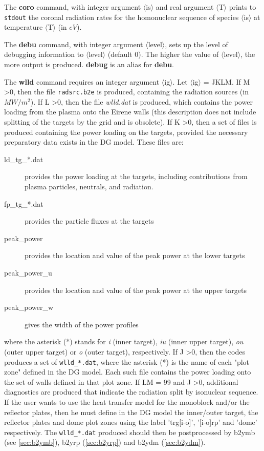 \documentclass[a4paper,10pt]{report}
\begin{document}
The {\bf coro} command, with integer argument $\langle$is$\rangle$ and real argument $\langle$T$\rangle$
prints to {\tt stdout} the coronal radiation
rates for the homonuclear sequence of species $\langle$is$\rangle$ at temperature $\langle$T$\rangle$ (in $eV$).

The {\bf debu} command, with integer argument $\langle$level$\rangle$,
sets up the level of debugging information to $\langle$level$\rangle$ (default 0).
The higher the value of $\langle$level$\rangle$, the more output is produced.
{\bf debug} is an alias for {\bf debu}.

The {\bf wlld} command requires an integer argument $\langle$ig$\rangle$. Let
$\langle$ig$\rangle$ = JKLM. If M \textgreater 0, then the file {\tt radsrc.b2e} is produced,
containing the radiation sources (in $MW/m^2$). If L \textgreater 0, then the
file {\em wlld.dat} is produced, which contains the power loading
from the plasma onto the Eirene walls (this description does not include
splitting of the targets by the grid and is obsolete). If K \textgreater 0, then a
set of files is produced containing the power loading on the targets,
provided the necessary preparatory data exists in the DG model. These files
are:
\begin{description}
  \item[ld\_tg\_*.dat] provides the power loading at the targets, including contributions from plasma particles, neutrals, and radiation.
  \item[fp\_tg\_*.dat] provides the particle fluxes at the targets
  \item[peak\_power] provides the location and value of the peak power at the lower targets
  \item[peak\_power\_u] provides the location and value of the peak power at the upper targets
  \item[peak\_power\_w] gives the width of the power profiles
\end{description}
where the asterisk (*) stands for {\em i} (inner target), {\em iu} (inner upper target), {\em ou} (outer upper target) or {\em o} (outer target), respectively.
If J \textgreater 0, then the codes produces a set of {\tt wlld\_*.dat},
where the asterisk (*) is the name of each "plot zone" defined in the DG model.
Each such file contains the power loading onto the set of walls defined in that
plot zone. If LM = 99 and J \textgreater 0, additional diagnostics are produced that indicate the radiation split by isonuclear sequence.\\
If the user wants to use the heat transfer model for the monoblock and/or the reflector plates, then he must define in the DG model the inner/outer target, the reflector plates and dome plot zones using the label 'trg[i-o]', '[i-o]rp' and 'dome' respectively. The {\tt wlld\_*.dat} produced should then be postprocessed by b2ymb (see \ref{sec:b2ymb}), b2yrp (\ref{sec:b2yrp}) and b2ydm (\ref{sec:b2ydm}).
\end{document}

